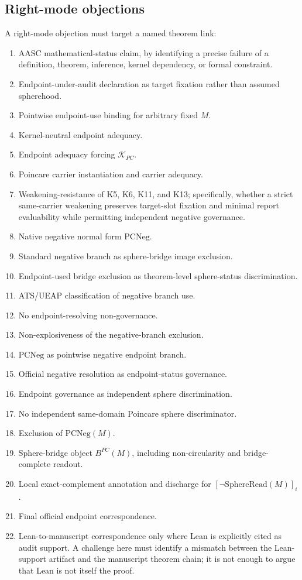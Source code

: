 \documentclass[11pt]{article}
\newcommand{\SphereRead}{\mathrm{SphereRead}}
\newcommand{\KPC}{\mathcal{K}_{PC}}
\newcommand{\PCNeg}{\mathrm{PCNeg}}
\newcommand{\BridgeObjPC}{B^{PC}}
\begin{document}
\subsection{Right-mode objections}
A right-mode objection must target a named theorem link:
\begin{enumerate}[label=\arabic*.]
\item AASC mathematical-status claim, by identifying a precise failure of a definition, theorem, inference, kernel dependency, or formal constraint.
\item Endpoint-under-audit declaration as target fixation rather than assumed spherehood.
\item Pointwise endpoint-use binding for arbitrary fixed \(M\).
\item Kernel-neutral endpoint adequacy.
\item Endpoint adequacy forcing \(\KPC\).
\item Poincare carrier instantiation and carrier adequacy.
\item Weakening-resistance of K5, K6, K11, and K13; specifically, whether a strict same-carrier weakening preserves target-slot fixation and minimal report evaluability while permitting independent negative governance.
\item Native negative normal form \(\PCNeg\).
\item Standard negative branch as sphere-bridge image exclusion.
\item Endpoint-used bridge exclusion as theorem-level sphere-status discrimination.
\item ATS/UEAP classification of negative branch use.
\item No endpoint-resolving non-governance.
\item Non-explosiveness of the negative-branch exclusion.
\item \(\PCNeg\) as pointwise negative endpoint branch.
\item Official negative resolution as endpoint-status governance.
\item Endpoint governance as independent sphere discrimination.
\item No independent same-domain Poincare sphere discriminator.
\item Exclusion of \(\PCNeg(M)\).
\item Sphere-bridge object \(\BridgeObjPC(M)\), including non-circularity and bridge-complete readout.
\item Local exact-complement annotation and discharge for \([\neg\SphereRead(M)]_i\).
\item Final official endpoint correspondence.
\item Lean-to-manuscript correspondence only where Lean is explicitly cited as audit support. A challenge here must identify a mismatch between the Lean-support artifact and the manuscript theorem chain; it is not enough to argue that Lean is not itself the proof.
\end{enumerate}
\end{document}
